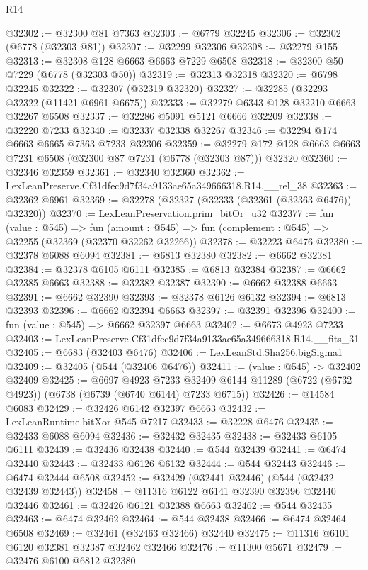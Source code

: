 \begin{lexlean}{R14}
\begin{coremodule}
@32302 := @32300 @81 @7363
@32303 := @6779 @32245
@32306 := @32302 (@6778 (@32303 @81))
@32307 := @32299 @32306
@32308 := @32279 @155
@32313 := @32308 @128 @6663 @6663 @7229 @6508
@32318 := @32300 @50 @7229 (@6778 (@32303 @50))
@32319 := @32313 @32318
@32320 := @6798 @32245
@32322 := @32307 (@32319 @32320)
@32327 := @32285 (@32293 @32322 (@11421 @6961 @6675))
@32333 := @32279 @6343 @128 @32210 @6663 @32267 @6508
@32337 := @32286 @5091 @5121 @6666 @32209
@32338 := @32220 @7233
@32340 := @32337 @32338 @32267
@32346 := @32294 @174 @6663 @6665 @7363 @7233 @32306
@32359 := @32279 @172 @128 @6663 @6663 @7231 @6508 (@32300 @87 @7231 (@6778 (@32303 @87))) @32320
@32360 := @32346 @32359
@32361 := @32340 @32360
@32362 := LexLeanPreserve.Cf31dfec9d7f34a9133ae65a349666318.R14.__rel_38
@32363 := @32362 @6961
@32369 := @32278 (@32327 (@32333 (@32361 (@32363 @6476)) @32320))
@32370 := LexLeanPreservation.prim_bitOr_u32
@32377 := fun (value : @545) =>
  fun (amount : @545) => fun (complement : @545) => @32255 (@32369 (@32370 @32262 @32266))
@32378 := @32223 @6476
@32380 := @32378 @6088 @6094
@32381 := @6813 @32380
@32382 := @6662 @32381
@32384 := @32378 @6105 @6111
@32385 := @6813 @32384
@32387 := @6662 @32385 @6663
@32388 := @32382 @32387
@32390 := @6662 @32388 @6663
@32391 := @6662 @32390
@32393 := @32378 @6126 @6132
@32394 := @6813 @32393
@32396 := @6662 @32394 @6663
@32397 := @32391 @32396
@32400 := fun (value : @545) => @6662 @32397 @6663
@32402 := @6673 @4923 @7233
@32403 := LexLeanPreserve.Cf31dfec9d7f34a9133ae65a349666318.R14.__fits_31
@32405 := @6683 (@32403 @6476)
@32406 := LexLeanStd.Sha256.bigSigma1
@32409 := @32405 (@544 (@32406 @6476))
@32411 := (value : @545) -> @32402 @32409
@32425 := @6697
    @4923
    @7233
    @32409
    @6144
    @11289
    (@6722 (@6732 @4923))
    (@6738 (@6739 (@6740 @6144) @7233 @6715))
@32426 := @14584 @6083
@32429 := @32426 @6142 @32397 @6663
@32432 := LexLeanRuntime.bitXor @545 @7217
@32433 := @32228 @6476
@32435 := @32433 @6088 @6094
@32436 := @32432 @32435
@32438 := @32433 @6105 @6111
@32439 := @32436 @32438
@32440 := @544 @32439
@32441 := @6474 @32440
@32443 := @32433 @6126 @6132
@32444 := @544 @32443
@32446 := @6474 @32444 @6508
@32452 := @32429 (@32441 @32446) (@544 (@32432 @32439 @32443))
@32458 := @11316 @6122 @6141 @32390 @32396 @32440 @32446
@32461 := @32426 @6121 @32388 @6663
@32462 := @544 @32435
@32463 := @6474 @32462
@32464 := @544 @32438
@32466 := @6474 @32464 @6508
@32469 := @32461 (@32463 @32466) @32440
@32475 := @11316 @6101 @6120 @32381 @32387 @32462 @32466
@32476 := @11300 @5671
@32479 := @32476 @6100 @6812 @32380

\end{coremodule}
\end{lexlean}
